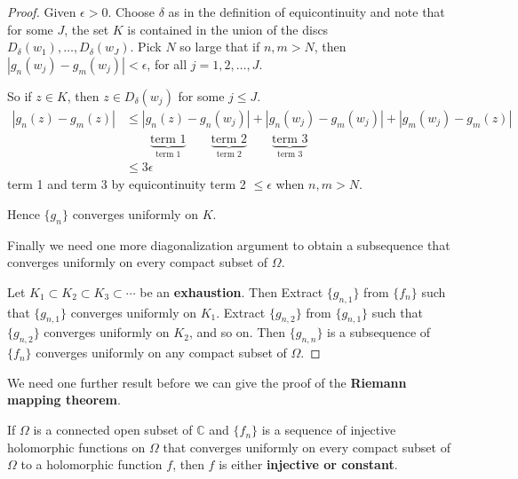 \documentclass{article}
\begin{document}
\begin{proof}
Given $\epsilon > 0$. Choose $\delta$ as in the definition of equicontinuity and note that for some $J$, the set $K$ is contained in the union of the discs $D_\delta(w_1), \dots, D_\delta(w_J)$. Pick $N$ so large that if $n, m > N$, then $|g_n(w_j) - g_m(w_j)| < \epsilon$, for all $j = 1, 2, \dots, J$.

So if $z \in K$, then $z \in D_\delta(w_j)$ for some $j \le J$.
\begin{align*}
|g_n(z) - g_m(z)| &\le |g_n(z) - g_n(w_j)| + |g_n(w_j) - g_m(w_j)| + |g_m(w_j) - g_m(z)| \\
&\qquad \underbrace{\text{term } 1}_{\text{term } 1} \qquad \underbrace{\text{term } 2}_{\text{term } 2} \qquad \underbrace{\text{term } 3}_{\text{term } 3} \\
&\le 3\epsilon
\end{align*}
term 1 and term 3 by equicontinuity
term 2 $\le \epsilon$ when $n, m > N$.

Hence $\{g_n\}$ converges uniformly on $K$.

Finally we need one more diagonalization argument to obtain a subsequence that converges uniformly on every compact subset of $\Omega$.

Let $K_1 \subset K_2 \subset K_3 \subset \cdots$ be an \textbf{exhaustion}. Then
Extract $\{g_{n, 1}\}$ from $\{f_n\}$ such that $\{g_{n, 1}\}$ converges uniformly on $K_1$. Extract $\{g_{n, 2}\}$ from $\{g_{n, 1}\}$ such that $\{g_{n, 2}\}$ converges uniformly on $K_2$, and so on.
Then $\{g_{n, n}\}$ is a subsequence of $\{f_n\}$ converges uniformly on any compact subset of $\Omega$.
\end{proof}

We need one further result before we can give the proof of the \textbf{Riemann mapping theorem}.

\begin{proposition}
\label{prop:3.5}
If $\Omega$ is a connected open subset of $\mathbb{C}$ and $\{f_n\}$ is a sequence of injective holomorphic functions on $\Omega$ that converges uniformly on every compact subset of $\Omega$ to a holomorphic function $f$, then $f$ is either \textbf{injective or constant}.
\end{proposition}
\end{document}
